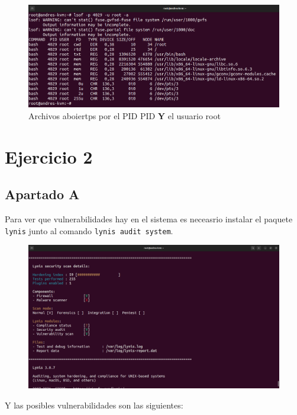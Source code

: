 \documentclass{article}
\begin{document}
\begin{figure}[H]
    \includegraphics[width=\textwidth]{imagenes/lsofand.png}
    \caption{Archivos aboiertps por el PID PID \textbf{Y} el usuario root}
\end{figure}

\section*{Ejercicio 2}
\subsection*{Apartado A}
Para ver que vulnerabilidades hay en el sistema es neceasrio instalar el paquete \verb|lynis| junto al comando \verb|lynis audit system|.

\begin{figure}[H]
    \includegraphics[width=\textwidth]{imagenes/lynisresults1.png}
\end{figure}

Y las posibles vulnerabilidades son las siguientes:
\end{document}
